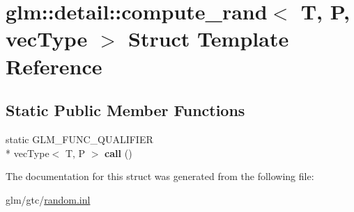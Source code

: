 \hypertarget{structglm_1_1detail_1_1compute__rand}{\section{glm\-:\-:detail\-:\-:compute\-\_\-rand$<$ T, P, vec\-Type $>$ Struct Template Reference}
\label{structglm_1_1detail_1_1compute__rand}
}
\subsection*{Static Public Member Functions}
\begin{DoxyCompactItemize}
\item 
\hypertarget{structglm_1_1detail_1_1compute__rand_ab66bca4a567d6f4aa01031d669d270d3}{static G\-L\-M\-\_\-\-F\-U\-N\-C\-\_\-\-Q\-U\-A\-L\-I\-F\-I\-E\-R \\*
vec\-Type$<$ T, P $>$ {\bfseries call} ()}\label{structglm_1_1detail_1_1compute__rand_ab66bca4a567d6f4aa01031d669d270d3}

\end{DoxyCompactItemize}


The documentation for this struct was generated from the following file\-:\begin{DoxyCompactItemize}
\item 
glm/gtc/\hyperlink{random_8inl}{random.\-inl}\end{DoxyCompactItemize}
